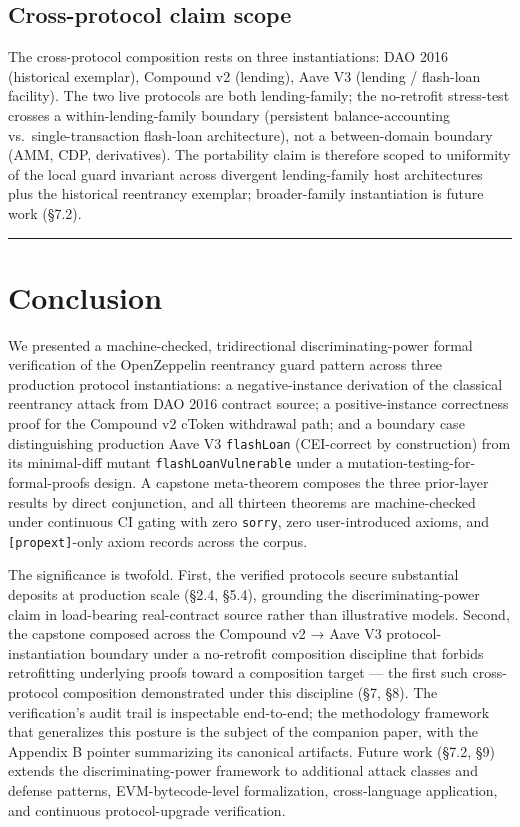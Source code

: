 \subsection{Cross-protocol claim
scope}\label{cross-protocol-claim-scope}

The cross-protocol composition rests on three instantiations: DAO 2016
(historical exemplar), Compound v2 (lending), Aave V3 (lending /
flash-loan facility). The two live protocols are both lending-family;
the no-retrofit stress-test crosses a within-lending-family boundary
(persistent balance-accounting vs.~single-transaction flash-loan
architecture), not a between-domain boundary (AMM, CDP, derivatives).
The portability claim is therefore scoped to uniformity of the local
guard invariant across divergent lending-family host architectures plus
the historical reentrancy exemplar; broader-family instantiation is
future work (§7.2).

\begin{center}\rule{0.5\linewidth}{0.5pt}\end{center}

\section{Conclusion}\label{conclusion}

We presented a machine-checked, tridirectional discriminating-power
formal verification of the OpenZeppelin reentrancy guard pattern across
three production protocol instantiations: a negative-instance derivation
of the classical reentrancy attack from DAO 2016 contract source; a
positive-instance correctness proof for the Compound v2 cToken
withdrawal path; and a boundary case distinguishing production Aave V3
\texttt{flashLoan} (CEI-correct by construction) from its minimal-diff
mutant \texttt{flashLoanVulnerable} under a
mutation-testing-for-formal-proofs design. A capstone meta-theorem
composes the three prior-layer results by direct conjunction, and all
thirteen theorems are machine-checked under continuous CI gating with
zero \texttt{sorry}, zero user-introduced axioms, and
\texttt{{[}propext{]}}-only axiom records across the corpus.

The significance is twofold. First, the verified protocols secure
substantial deposits at production scale (§2.4, §5.4), grounding the
discriminating-power claim in load-bearing real-contract source rather
than illustrative models. Second, the capstone composed across the
Compound v2 → Aave V3 protocol-instantiation boundary under a
no-retrofit composition discipline that forbids retrofitting underlying
proofs toward a composition target --- the first such cross-protocol
composition demonstrated under this discipline (§7, §8). The
verification's audit trail is inspectable end-to-end; the methodology
framework that generalizes this posture is the subject of the companion
paper, with the Appendix B pointer summarizing its canonical artifacts.
Future work (§7.2, §9) extends the discriminating-power framework to
additional attack classes and defense patterns, EVM-bytecode-level
formalization, cross-language application, and continuous
protocol-upgrade verification.


